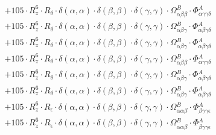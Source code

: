 \documentclass{article}
\begin{document}
\begin{subequations}
\begin{gather}
\begin{array}{c}
 \\[0.2em] 		 + 105 \cdot R_{z}^{6} \cdot R_{\delta{}} \cdot \delta{}\left(\alpha{}, \alpha{}\right) \cdot \delta{}\left(\beta{}, \beta{}\right) \cdot \delta{}\left(\gamma{}, \gamma{}\right) \cdot \Omega{}^{B}_{\alpha{}\beta{}\beta{}} \cdot \Phi{}^{A}_{\alpha{}\gamma{}\gamma{}\delta{}} 
 \\[0.2em] 		 + 105 \cdot R_{z}^{6} \cdot R_{\delta{}} \cdot \delta{}\left(\alpha{}, \alpha{}\right) \cdot \delta{}\left(\beta{}, \beta{}\right) \cdot \delta{}\left(\gamma{}, \gamma{}\right) \cdot \Omega{}^{B}_{\alpha{}\beta{}\gamma{}} \cdot \Phi{}^{A}_{\alpha{}\beta{}\gamma{}\delta{}} 
 \\[0.2em] 		 + 105 \cdot R_{z}^{6} \cdot R_{\delta{}} \cdot \delta{}\left(\alpha{}, \alpha{}\right) \cdot \delta{}\left(\beta{}, \beta{}\right) \cdot \delta{}\left(\gamma{}, \gamma{}\right) \cdot \Omega{}^{B}_{\alpha{}\beta{}\gamma{}} \cdot \Phi{}^{A}_{\alpha{}\beta{}\gamma{}\delta{}} 
 \\[0.2em] 		 + 105 \cdot R_{z}^{6} \cdot R_{\delta{}} \cdot \delta{}\left(\alpha{}, \alpha{}\right) \cdot \delta{}\left(\beta{}, \beta{}\right) \cdot \delta{}\left(\gamma{}, \gamma{}\right) \cdot \Omega{}^{B}_{\alpha{}\beta{}\beta{}} \cdot \Phi{}^{A}_{\alpha{}\gamma{}\gamma{}\delta{}} 
 \\[0.2em] 		 + 105 \cdot R_{z}^{6} \cdot R_{\delta{}} \cdot \delta{}\left(\alpha{}, \alpha{}\right) \cdot \delta{}\left(\beta{}, \beta{}\right) \cdot \delta{}\left(\gamma{}, \gamma{}\right) \cdot \Omega{}^{B}_{\alpha{}\beta{}\gamma{}} \cdot \Phi{}^{A}_{\alpha{}\beta{}\gamma{}\delta{}} 
 \\[0.2em] 		 + 105 \cdot R_{z}^{6} \cdot R_{\delta{}} \cdot \delta{}\left(\alpha{}, \alpha{}\right) \cdot \delta{}\left(\beta{}, \beta{}\right) \cdot \delta{}\left(\gamma{}, \gamma{}\right) \cdot \Omega{}^{B}_{\alpha{}\beta{}\gamma{}} \cdot \Phi{}^{A}_{\alpha{}\beta{}\gamma{}\delta{}} 
 \\[0.2em] 		 + 105 \cdot R_{z}^{6} \cdot R_{\epsilon{}} \cdot \delta{}\left(\alpha{}, \alpha{}\right) \cdot \delta{}\left(\beta{}, \beta{}\right) \cdot \delta{}\left(\gamma{}, \gamma{}\right) \cdot \Omega{}^{B}_{\alpha{}\alpha{}\beta{}} \cdot \Phi{}^{A}_{\beta{}\gamma{}\gamma{}\epsilon{}} 
 \\[0.2em] 		 + 105 \cdot R_{z}^{6} \cdot R_{\epsilon{}} \cdot \delta{}\left(\alpha{}, \alpha{}\right) \cdot \delta{}\left(\beta{}, \beta{}\right) \cdot \delta{}\left(\gamma{}, \gamma{}\right) \cdot \Omega{}^{B}_{\alpha{}\alpha{}\beta{}} \cdot \Phi{}^{A}_{\beta{}\gamma{}\gamma{}\epsilon{}} 

\end{array}
\end{gather}
\end{subequations}
\end{document}
